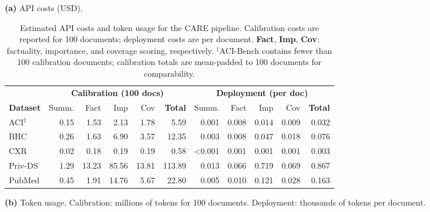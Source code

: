 \begin{table}[!t]
\centering
\small
\caption{Estimated API costs and token usage for the CARE pipeline. Calibration costs are reported for 100 documents; deployment costs are per document. \textbf{Fact}, \textbf{Imp}, \textbf{Cov}: factuality, importance, and coverage scoring, respectively. $^\ddagger$ACI-Bench contains fewer than 100 calibration documents; calibration totals are mean-padded to 100 documents for comparability.}
\label{tab:cost}
\vspace{0.5em}
\textbf{(a)} API costs (USD).
\vspace{0.3em}

\begin{tabular}{l rrrrr rrrrr}
\toprule
& \multicolumn{5}{c}{\textbf{Calibration (100 docs)}} & \multicolumn{5}{c}{\textbf{Deployment (per doc)}} \\
\cmidrule(lr){2-6} \cmidrule(lr){7-11}
\textbf{Dataset} & Summ. & Fact & Imp & Cov & \textbf{Total} & Summ. & Fact & Imp & Cov & \textbf{Total} \\
\midrule
ACI$^\ddagger$ & 0.15 & 1.53 & 2.13 & 1.78 & 5.59 & 0.001 & 0.008 & 0.014 & 0.009 & 0.032 \\
BHC & 0.26 & 1.63 & 6.90 & 3.57 & 12.35 & 0.003 & 0.008 & 0.047 & 0.018 & 0.076 \\
CXR & 0.02 & 0.18 & 0.19 & 0.19 & 0.58 & <0.001 & 0.001 & 0.001 & 0.001 & 0.003 \\
Priv-DS & 1.29 & 13.23 & 85.56 & 13.81 & 113.89 & 0.013 & 0.066 & 0.719 & 0.069 & 0.867 \\
PubMed & 0.45 & 1.91 & 14.76 & 5.67 & 22.80 & 0.005 & 0.010 & 0.121 & 0.028 & 0.163 \\
\bottomrule
\end{tabular}
\par\vspace{1.5em}
\textbf{(b)} Token usage.
Calibration: millions of tokens for 100 documents. Deployment: thousands of tokens per document.
\vspace{0.3em}


\end{table}
